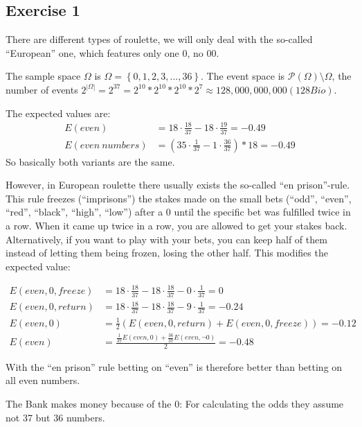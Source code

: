 \subsection*{Exercise 1}
There are different types of roulette, we will only deal with the so-called 
``European'' one, which features only one $0$, no $00$.

The sample space $\Omega$ is $\Omega=\left\{0, 1, 2, 3, ..., 36\right\}$. The event space is $\mathcal{P} \left( \Omega \right) \setminus \Omega$, the number of events $2^{|\Omega|} = 2^37 = 2^10 * 2^10 * 2^10 * 2^7 \approx 128,000,000,000 (128 Bio)$.

The expected values are:
\begin{align*}
E(even) &= 18 \cdot \frac{18}{37} - 18 \cdot \frac{19}{37} = -0.49\\
E(even\ numbers) &= \left(35 \cdot \frac{1}{37} - 1 \cdot \frac{36}{37} \right) * 18 = -0.49
\end{align*}
So basically both variants are the same. 

However, in European roulette there usually exists the so-called ``en prison''-rule. This rule freezes (``imprisons'') the stakes made on the small bets (``odd'', ``even'', ``red'', ``black'', ``high'', ``low'') after a $0$ until the specific bet was fulfilled twice in a row. When it came up twice in a row, you are allowed to get your stakes back. Alternatively, if you want to play with your bets, you can keep half of them instead of letting them being frozen, losing the other half. This modifies the expected value:

\begin{align*}
E(even, 0, freeze) &= 18 \cdot \frac{18}{37} - 18 \cdot \frac{18}{37} - 0 \cdot \frac{1}{37} = 0  \\
E(even, 0, return) &= 18 \cdot \frac{18}{37} - 18 \cdot \frac{18}{37} - 9 \cdot \frac{1}{37} = -0.24  \\
E(even, 0) &= \frac{1}{2} \left( E(even, 0, return) + E(even, 0, freeze) \right) = -0.12 \\
E(even) &= \frac{\frac{1}{37} E(even, 0) + \frac{36}{37} E(even, \neg 0)}{2} = -0.48
\end{align*}

With the ``en prison'' rule betting on ``even'' is therefore better than betting on all even numbers.

\noindent {}

The Bank makes money because of the $0$: For calculating the odds they assume not 37 but 36 numbers.


